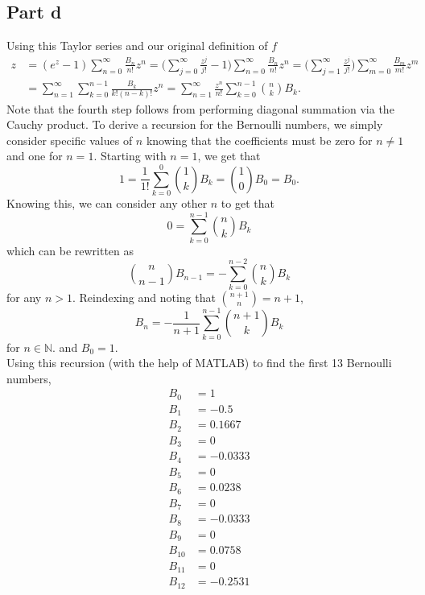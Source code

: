 \documentclass{article}
\begin{document}
\subsection{Part d}
Using this Taylor series and our original definition of $f$
\begin{align*}
z&=(e^z-1)\sum_{n=0}^\infty \frac{B_n}{n!}z^n=\biggr(\sum_{j=0}^\infty \frac{z^j}{j!}-1\biggr)\sum_{n=0}^\infty \frac{B_n}{n!}z^n=\biggr(\sum_{j=1}^\infty \frac{z^j}{j!}\biggr)\sum_{m=0}^\infty \frac{B_m}{m!}z^m\\&=
\sum_{n=1}^\infty\sum_{k=0}^{n-1}\frac{B_k}{k!(n-k)!}z^n=\sum_{n=1}^\infty\frac{z^n}{n!}\sum_{k=0}^{n-1}\binom{n}{k}B_k.
\end{align*}
Note that the fourth step follows from performing diagonal summation via the Cauchy product. To derive a recursion for the Bernoulli numbers, we simply consider specific values of $n$ knowing that the coefficients must be zero for $n\neq1$ and one for $n=1$. Starting with $n=1$, we get that 
\[
1 = \frac{1}{1!}\sum_{k=0}^0\binom{1}{k}B_k=\binom{1}{0}B_0=B_0.
\]
Knowing this, we can consider any other $n$ to get that 
\[
0=\sum_{k=0}^{n-1}\binom{n}{k}B_k
\]
which can be rewritten as 
\[
\binom{n}{n-1}B_{n-1}=-\sum_{k=0}^{n-2}\binom{n}{k}B_k
\]
for any $n>1$. Reindexing and noting that $\binom{n+1}{n}=n+1$, 
\[
B_n=-\frac{1}{n+1}\sum_{k=0}^{n-1}\binom{n+1}{k}B_k
\]
for $n\in\mathbb{N}$. and $B_0=1$. \\
Using this recursion (with the help of MATLAB) to find the first 13 Bernoulli numbers, 
\begin{align*}
B_0&=1\\
B_1&=-0.5\\
B_2&=0.1667\\
B_3&=0\\
B_4&=-0.0333\\
B_5&=0\\
B_6&=0.0238\\
B_7&=0\\
B_8&=-0.0333\\
B_9&=0\\
B_{10}&=0.0758\\
B_{11}&=0\\
B_{12}&=-0.2531
\end{align*}
\end{document}
